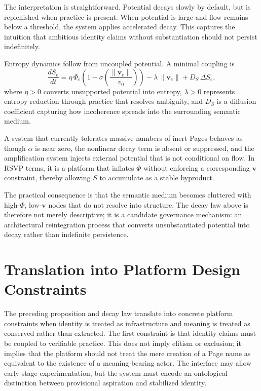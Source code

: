 \documentclass[11pt,oneside]{article}
\begin{document}
The interpretation is straightforward. Potential decays slowly by default, but is replenished when practice is present. When potential is large and flow remains below a threshold, the system applies accelerated decay. This captures the intuition that ambitious identity claims without substantiation should not persist indefinitely.

Entropy dynamics follow from uncoupled potential. A minimal coupling is
\[
\frac{dS_e}{dt} = \eta\,\Phi_e\left(1-\sigma\!\left(\frac{\|\mathbf{v}_e\|}{v_0}\right)\right) - \lambda\,\|\mathbf{v}_e\| + D_S\,\Delta S_e,
\]
where $\eta>0$ converts unsupported potential into entropy, $\lambda>0$ represents entropy reduction through practice that resolves ambiguity, and $D_S$ is a diffusion coefficient capturing how incoherence spreads into the surrounding semantic medium.

A system that currently tolerates massive numbers of inert Pages behaves as though $\alpha$ is near zero, the nonlinear decay term is absent or suppressed, and the amplification system injects external potential that is not conditional on flow. In RSVP terms, it is a platform that inflates $\Phi$ without enforcing a corresponding $\mathbf{v}$ constraint, thereby allowing $S$ to accumulate as a stable byproduct.

The practical consequence is that the semantic medium becomes cluttered with high-$\Phi$, low-$\mathbf{v}$ nodes that do not resolve into structure. The decay law above is therefore not merely descriptive; it is a candidate governance mechanism: an architectural reintegration process that converts unsubstantiated potential into decay rather than indefinite persistence.

\section{Translation into Platform Design Constraints}

The preceding proposition and decay law translate into concrete platform constraints when identity is treated as infrastructure and meaning is treated as conserved rather than extracted. The first constraint is that identity claims must be coupled to verifiable practice. This does not imply elitism or exclusion; it implies that the platform should not treat the mere creation of a Page name as equivalent to the existence of a meaning-bearing actor. The interface may allow early-stage experimentation, but the system must encode an ontological distinction between provisional aspiration and stabilized identity.
\end{document}
